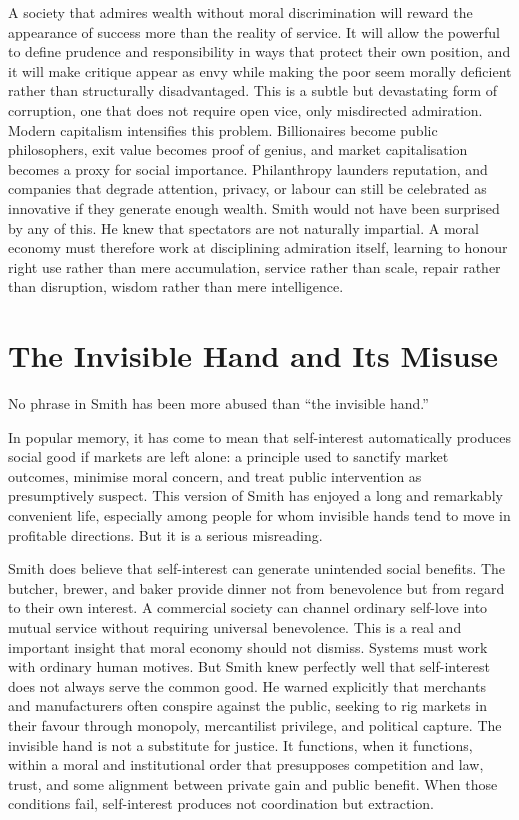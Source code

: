 \documentclass[11pt,a4paper,oneside]{book}
\begin{document}
A society that admires wealth without moral discrimination will reward the appearance of success more than the reality of service. It will allow the powerful to define prudence and responsibility in ways that protect their own position, and it will make critique appear as envy while making the poor seem morally deficient rather than structurally disadvantaged. This is a subtle but devastating form of corruption, one that does not require open vice, only misdirected admiration. Modern capitalism intensifies this problem. Billionaires become public philosophers, exit value becomes proof of genius, and market capitalisation becomes a proxy for social importance. Philanthropy launders reputation, and companies that degrade attention, privacy, or labour can still be celebrated as innovative if they generate enough wealth. Smith would not have been surprised by any of this. He knew that spectators are not naturally impartial. A moral economy must therefore work at disciplining admiration itself, learning to honour right use rather than mere accumulation, service rather than scale, repair rather than disruption, wisdom rather than mere intelligence.

\section*{The Invisible Hand and Its Misuse}

No phrase in Smith has been more abused than ``the invisible hand.''

In popular memory, it has come to mean that self-interest automatically produces social good if markets are left alone: a principle used to sanctify market outcomes, minimise moral concern, and treat public intervention as presumptively suspect. This version of Smith has enjoyed a long and remarkably convenient life, especially among people for whom invisible hands tend to move in profitable directions. But it is a serious misreading.

Smith does believe that self-interest can generate unintended social benefits. The butcher, brewer, and baker provide dinner not from benevolence but from regard to their own interest. A commercial society can channel ordinary self-love into mutual service without requiring universal benevolence. This is a real and important insight that moral economy should not dismiss. Systems must work with ordinary human motives. But Smith knew perfectly well that self-interest does not always serve the common good. He warned explicitly that merchants and manufacturers often conspire against the public, seeking to rig markets in their favour through monopoly, mercantilist privilege, and political capture. The invisible hand is not a substitute for justice. It functions, when it functions, within a moral and institutional order that presupposes competition and law, trust, and some alignment between private gain and public benefit. When those conditions fail, self-interest produces not coordination but extraction.
\end{document}
